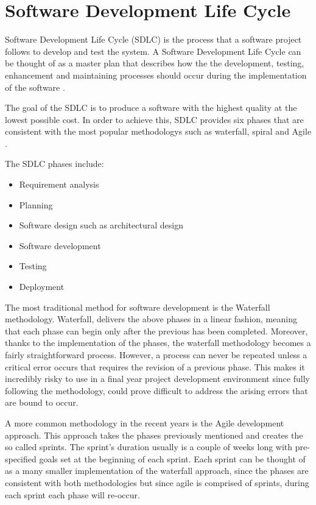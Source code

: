 \section{Software Development Life Cycle}
Software Development Life Cycle (SDLC) is the process that a software project follows to develop and test the system. A Software Development Life Cycle can be thought of as a master plan that describes how the the development, testing, enhancement and maintaining processes should occur during the implementation of the software \cite{stackify_2017_what}.

The goal of the SDLC is to produce a software with the highest quality at the lowest possible cost. In order to achieve this, SDLC provides six phases that are consistent with the most popular methodologys such as waterfall, spiral and Agile \cite{stackify_2017_what}.

The SDLC phases include:
\begin{itemize}
  \item Requirement analysis
  \item Planning
  \item Software design such as architectural design
  \item Software development
  \item Testing
  \item Deployment
\end{itemize}

The most traditional method for software development is the Waterfall methodology. Waterfall, delivers the above phases in a linear fashion, meaning that each phase can begin only after the previous has been completed. Moreover, thanks to the implementation of the phases, the waterfall methodology becomes a fairly straightforward process. However, a process can never be repeated unless a critical error occurs that requires the revision of a previous phase. This makes it incredibly risky to use in a final year project development environment since fully following the methodology, could prove difficult to address the arising errors that are bound to occur.

A more common methodology in the recent years is the Agile development approach. This approach takes the phases previously mentioned and creates the so called sprints. The sprint's duration usually is a couple of weeks long with pre-specified goals set at the beginning of each sprint. Each sprint can be thought of as a many smaller implementation of the waterfall approach, since the phases are consistent with both methodologies but since agile is comprised of sprints, during each sprint each phase will re-occur.

